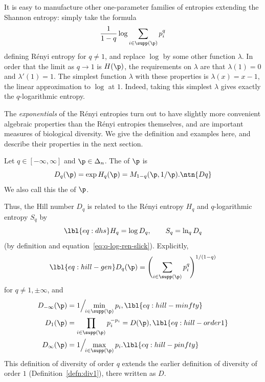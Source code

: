 \begin{remark}
It is easy to manufacture other one-parameter families of entropies
extending the Shannon entropy: simply take the formula
\[
\frac{1}{1 - q} \log \sum_{i \in \supp(\p)} p_i^q
\]
defining R\'enyi entropy for $q \neq 1$, and replace $\log$ by some other
function $\lambda$.  In order that the limit as $q \to 1$ is $H(\p)$, the
requirements on $\lambda$ are that $\lambda(1) = 0$ and $\lambda'(1) = 1$.
The simplest function $\lambda$ with these properties is $\lambda(x) = x - 1$,
the linear approximation to $\log$ at $1$.  Indeed, taking this simplest
$\lambda$ gives exactly the $q$-logarithmic entropy.
\end{remark}

The \emph{exponentials} of the R\'enyi entropies turn out to have slightly
more convenient algebraic properties than the R\'enyi entropies themselves,
and are important measures of biological diversity.  We give the definition
and examples here, and describe their properties in the next section.

\begin{defn}
% 
Let $q \in [-\infty, \infty]$ and $\p \in \Delta_n$.  The  of $\p$ is
\[
D_q(\p)
=
\exp H_q(\p)
=
M_{1 - q}(\p, 1/\p).
\ntn{Dq}
\]
We also call this the  of $\p$.
\end{defn}

Thus, the Hill number $D_q$ is related to the R\'enyi entropy $H_q$ and
$q$-logarithmic entropy $S_q$ by
% 
\begin{equation}
\lbl{eq:dhs}
H_q = \log D_q,
\qquad
S_q = \ln_q D_q
\end{equation}
% 
(by definition and equation~\eqref{eq:q-log-ren-slick}).  Explicitly, 
% 
\begin{equation}
\lbl{eq:hill-gen}
D_q(\p) 
=
\Biggl( \sum_{i \in \supp(\p)} p_i^q \Biggr)^{1/(1 - q)}
\end{equation}
% 
for $q \neq 1, \pm\infty$, and
% 
\begin{align}
D_{-\infty}(\p) &
=
1\Big/\!\!\min_{i \in \supp(\p)} p_i,   
\lbl{eq:hill-minfty}    \\
D_1(\p) &
=
\prod_{i \in \supp(\p)} p_i^{-p_i}
=
D(\p),  
\lbl{eq:hill-order1}    \\
D_\infty(\p)    &
=
1\Big/\!\!\max_{i \in \supp(\p)} p_i.
\lbl{eq:hill-pinfty}
\end{align}
%
This definition of diversity of order $q$ extends the earlier definition of
diversity of order $1$ (Definition~\ref{defn:div1}), there written as $D$.

